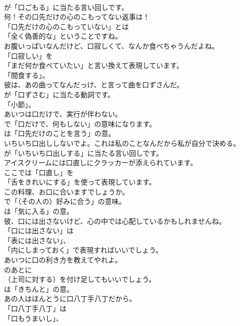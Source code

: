 \documentclass[8pt]{extreport}
\begin{document}
\begin{CJK}{UTF8}{min}
\\	が「口ごもる」に当たる言い回しです。	
\\	何！その口先だけの心のこもってない返事は！ 
\\	「口先だけの心のこもっていない」とは
\\	「全く偽善的な」ということですね。	
\\	お腹いっぱいなんだけど、口寂しくて、なんか食べちゃうんだよね。 
\\	「口寂しい」を
\\	「まだ何か食べていたい」と言い換えて表現しています。
\\	「間食する」。	
\\	彼は、あの曲ってなんだっけ、と言って曲を口ずさんだ。 
\\	が「口ずさむ」に当たる動詞です。
\\	「小節」。	
\\	あいつは口だけで、実行が伴わない。 
\\	で「口だけで、何もしない」の意味になります。
\\	は「口先だけのことを言う」の意。	
\\	いちいち口出ししないでよ。これは私のことなんだから私が自分で決める。 
\\	が「いちいち口出しする」に当たる言い回しです。	
\\	アイスクリームには口直しにクラッカーが添えられています。 
\\	ここでは「口直し」を
\\	「舌をきれいにする」を使って表現しています。	
\\	この料理、お口に合いますでしょうか。 
\\	で「（その人の）好みに合う」の意味。
\\	は「気に入る」の意。	
\\	彼、口には出さないけど、心の中では心配しているかもしれませんね。 
\\	「口には出さない」は
\\	「表には出さない」、
\\	「内にしまっておく」で表現すればいいでしょう。	
\\	あいつに口の利き方を教えてやれよ。 
\\	のあとに 
\\	（上司に対する）を付け足してもいいでしょう。
\\	は「きちんと」の意。	
\\	あの人はほんとうに口八丁手八丁だから。 
\\	「口八丁手八丁」は
\\	「口もうまいし」、

\end{CJK}
\end{document}
